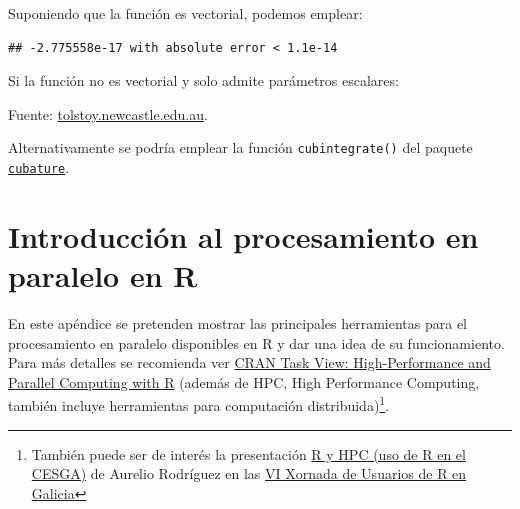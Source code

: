 \documentclass[
]{book}
\newenvironment{Shaded}{\begin{snugshade}}{\end{snugshade}}
\newcommand{\ControlFlowTok}[1]{\textcolor[rgb]{0.13,0.29,0.53}{\textbf{#1}}}
\newcommand{\FunctionTok}[1]{\textcolor[rgb]{0.00,0.00,0.00}{#1}}
\newcommand{\NormalTok}[1]{#1}
\newcommand{\SpecialCharTok}[1]{\textcolor[rgb]{0.00,0.00,0.00}{#1}}
\theoremstyle{break}
\theoremstyle{nonumberplain}
\begin{document}
Suponiendo que la función es vectorial, podemos emplear:

\begin{Shaded}
\end{Shaded}

\begin{verbatim}
## -2.775558e-17 with absolute error < 1.1e-14
\end{verbatim}

Si la función no es vectorial y solo admite parámetros escalares:

\begin{Shaded}
\end{Shaded}

Fuente: \href{http://tolstoy.newcastle.edu.au/R/help/04/10/5951.html}{tolstoy.newcastle.edu.au}.

Alternativamente se podría emplear la función \texttt{cubintegrate()} del paquete \href{https://bnaras.github.io/cubature/}{\texttt{cubature}}.

\hypertarget{intro-hpc}{%
\chapter{Introducción al procesamiento en paralelo en R}\label{intro-hpc}}

En este apéndice se pretenden mostrar las principales herramientas para el procesamiento en paralelo disponibles en R y dar una idea de su funcionamiento.
Para más detalles se recomienda ver \href{https://cran.r-project.org/view=HighPerformanceComputing}{CRAN Task View: High-Performance and Parallel Computing with R}
(además de HPC, High Performance Computing, también incluye herramientas para computación distribuida)\footnote{También puede ser de interés la presentación \href{https://www.r-users.gal/sites/default/files/10_aurelio_rodriguez.pdf}{R y HPC (uso de R en el CESGA)} de Aurelio Rodríguez en las \href{https://www.r-users.gal/pagina/programa-2018}{VI Xornada de Usuarios de R en Galicia}}.
\end{document}
